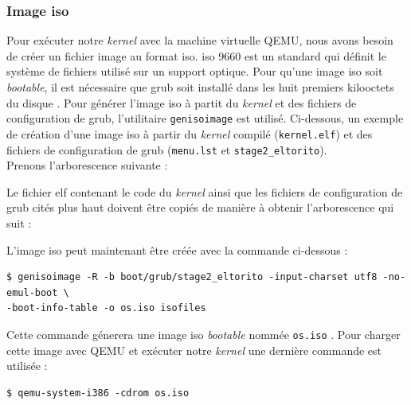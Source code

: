 
\subsubsection{Image \acrshort{iso}}
\label{iso}
Pour exécuter notre \textit{kernel} avec la machine virtuelle QEMU, nous avons
besoin de créer un fichier image au format \acrshort{iso}. \acrshort{iso} 9660
est un standard qui définit le système de fichiers utilisé sur un support optique.
Pour qu'une image \acrshort{iso} soit \textit{bootable}, il est nécessaire que
\acrshort{grub} soit installé dans les huit premiers kilooctets du disque \cite{ref42}.
Pour générer l'image \acrshort{iso} à partit du \textit{kernel} et des fichiers
de configuration de \acrshort{grub}, l'utilitaire \texttt{genisoimage}
est utilisé. Ci-dessous, un exemple de création d'une image \acrshort{iso} à
partir du \textit{kernel} compilé (\texttt{kernel.elf}) et des fichiers
de configuration de \acrshort{grub} (\texttt{menu.lst} et
\texttt{stage2_eltorito}). \\

Prenons l'arborescence suivante : \\

 \newpage

Le fichier \acrshort{elf} contenant le code du \textit{kernel} ainsi que les
fichiers de configuration de \acrshort{grub} cités plus haut doivent être copiés
de manière à obtenir l'arborescence qui suit : \\

 \bigbreak

L'image \acrshort{iso} peut maintenant être créée avec la commande ci-dessous :

\begin{verbatim}
$ genisoimage -R -b boot/grub/stage2_eltorito -input-charset utf8 -no-emul-boot \
-boot-info-table -o os.iso isofiles
\end{verbatim}

Cette commande génerera une image \acrshort{iso} \textit{bootable} nommée
\texttt{os.iso} \cite{ref42}. Pour charger cette image avec QEMU
et exécuter notre \textit{kernel} une dernière commande est utilisée :

\begin{verbatim}
$ qemu-system-i386 -cdrom os.iso
\end{verbatim}